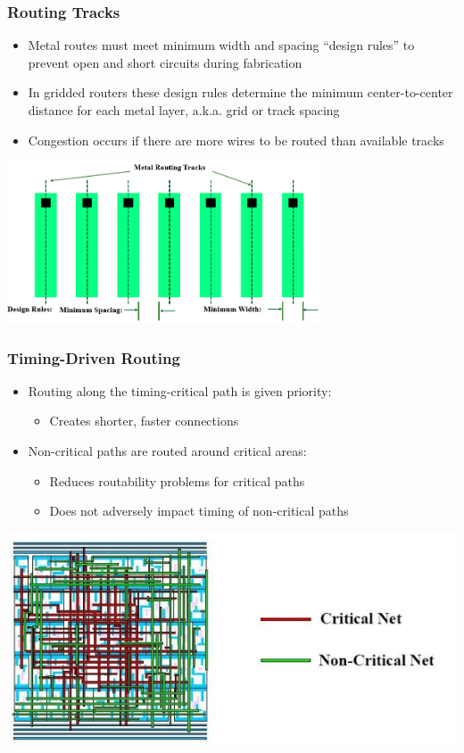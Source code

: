\documentclass[compress]{beamer}
\begin{document}
\begin{frame}
	\frametitle{Routing Tracks}
	\begin{itemize}
		\item Metal routes must meet minimum width and spacing “design rules”
		to prevent open and short circuits during fabrication
		\item In gridded routers these design rules determine the minimum
		center-to-center distance for each metal layer, a.k.a. grid or track
		spacing
		\item Congestion occurs if there are more wires to be routed than
		available tracks
	\end{itemize}
	\begin{center}
		\includegraphics[width=0.7\textwidth]{Tracks}
	\end{center}
\end{frame}
\begin{frame}
	\frametitle{Timing-Driven Routing}
		\begin{itemize}
			\item Routing along the timing-critical path is given priority:
			\begin{itemize}
				\item Creates shorter, faster connections
			\end{itemize}
			\item Non-critical paths are routed around critical areas:
			\begin{itemize}
				\item Reduces routability problems for critical paths
				\item Does not adversely impact timing of non-critical paths
			\end{itemize}
		\end{itemize}
		
		\begin{center}
			\includegraphics[width=0.7 \textwidth]{Rout-ability }
		\end{center}
\end{frame}
\end{document}
